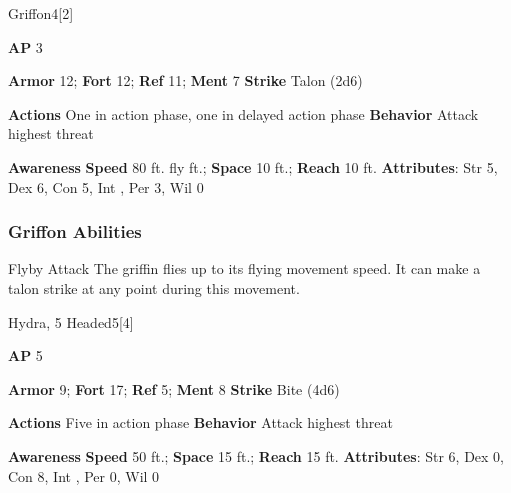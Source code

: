 \begin{monsection}{Griffon}{4}[2]
\vspace{-1em}\vspace{-1em}
\begin{spellcontent}
\begin{spelltargetinginfo}
{\textbf{AP} 3}

\pari \textbf{Armor} 12;
\textbf{Fort} 12;
\textbf{Ref} 11;
\textbf{Ment} 7
\pari \textbf{Strike} Talon  (2d6)


\pari \textbf{Actions} One in action phase, one in delayed action phase
\pari \textbf{Behavior} Attack highest threat
\end{spelltargetinginfo}
\end{spellcontent}

\begin{monsterfooter}
\pari \textbf{Awareness} 
\pari \textbf{Speed} 80 ft. fly ft.;
\textbf{Space} 10 ft.;
\textbf{Reach} 10 ft.
\pari \textbf{Attributes}:
Str 5,
Dex 6,
Con 5,
Int ,
Per 3,
Wil 0
\end{monsterfooter}
\end{monsection}


\subsubsection{Griffon Abilities}

\begin{ability}{Flyby Attack}
The griffin flies up to its flying movement speed.
It can make a talon strike at any point during this movement.
\end{ability}






\begin{monsection}{Hydra, 5 Headed}{5}[4]
\vspace{-1em}\vspace{-1em}
\begin{spellcontent}
\begin{spelltargetinginfo}
{\textbf{AP} 5}

\pari \textbf{Armor} 9;
\textbf{Fort} 17;
\textbf{Ref} 5;
\textbf{Ment} 8
\pari \textbf{Strike} Bite  (4d6)


\pari \textbf{Actions} Five in action phase
\pari \textbf{Behavior} Attack highest threat
\end{spelltargetinginfo}
\end{spellcontent}

\begin{monsterfooter}
\pari \textbf{Awareness} 
\pari \textbf{Speed} 50 ft.;
\textbf{Space} 15 ft.;
\textbf{Reach} 15 ft.
\pari \textbf{Attributes}:
Str 6,
Dex 0,
Con 8,
Int ,
Per 0,
Wil 0
\end{monsterfooter}
\end{monsection}


